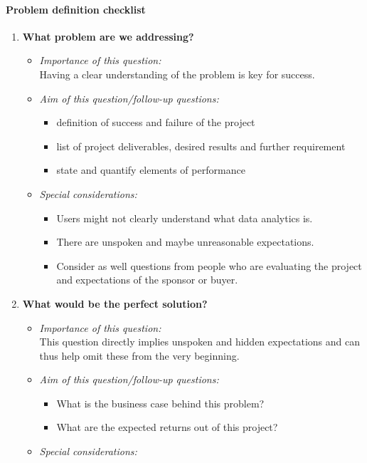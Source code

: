 \documentclass[a4paper, landscape, 6pt, fleqn]{scrartcl}
\renewcommand{\emph}[1]{\textbf{#1}}
\begin{document}
\begin{multicols*}{4}
\paragraph{Problem definition checklist}

\begin{enumerate}
\item \emph{What problem are we addressing?} 
\begin{itemize}
\item \textit{Importance of this question:} \\
Having a clear understanding of the problem is key for success.
\item \textit{Aim of this question/follow-up questions:}
\begin{itemize}
\item definition of success and failure of the project
\item list of project deliverables, desired results and further requirement
\item state and quantify elements of performance
\end{itemize}
\item \textit{Special considerations:}
\begin{itemize}
\item Users might not clearly understand what data analytics is.
\item There are unspoken and maybe unreasonable expectations.
\item Consider as well questions from people who are evaluating the project and expectations of the sponsor or buyer.
\end{itemize}
\end{itemize}
\item \emph{What would be the perfect solution?}
\begin{itemize}
\item \textit{Importance of this question:} \\
This question directly implies unspoken and hidden expectations and can thus help omit these from the very beginning.
\item \textit{Aim of this question/follow-up questions:}
\begin{itemize}
\item What is the business case behind this problem?
\item What are the expected returns out of this project?
\end{itemize}
\item \textit{Special considerations:}

\end{itemize}
\end{enumerate}
\end{multicols*}
\end{document}
